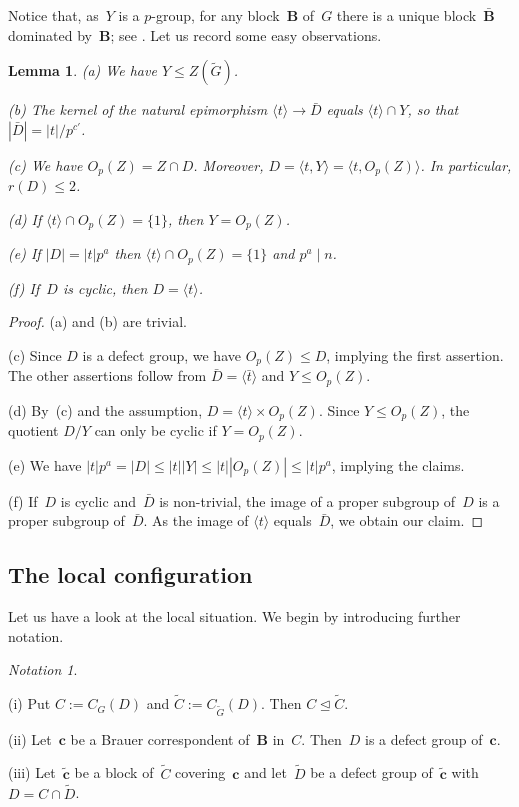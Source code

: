 \documentclass[12pt]{amsart}
\newcommand{\bB}{{\mathbf{B}}}
\newcommand{\bc}{{\mathbf{c}}}
\newtheorem{lem}[thm]{Lemma}
\theoremstyle{theorem}
\theoremstyle{definition}
\theoremstyle{remark}
\newtheorem{notn}[thm]{Notation}
\begin{document}
Notice that, as~$Y$ is a $p$-group, for any block~$\bB$ of~$G$ there is a 
unique block~$\bar{\bB}$ dominated by~$\bB$; see \cite[Theorem~$5.8.11$]{NaTs}.
Let us record some easy observations.

\begin{lem}
\label{YEqualOpZ}
{\rm (a)} We have $Y \leq Z( \tilde{G} )$.

{\rm (b)} The kernel of the natural epimorphism 
$\langle t \rangle \rightarrow \bar{D}$ equals $\langle t \rangle \cap Y$, so
that $|\bar{D}| = |t|/p^{c'}$.

{\rm (c)} We have $O_p( Z ) = Z \cap D$. Moreover, 
$D = \langle t, Y \rangle = \langle t, O_p(Z) \rangle$. In particular, 
$r(D) \leq 2$.

{\rm (d)} If $\langle t \rangle \cap O_p( Z ) = \{ 1 \}$, then $Y = O_p( Z )$.

{\rm (e)} If $|D| = |t|p^{a}$ then 
$\langle t \rangle \cap O_p( Z ) = \{ 1 \}$ and $p^a \mid n$.

{\rm (f)} If~$D$ is cyclic, then $D = \langle t \rangle$.
\end{lem}
\begin{proof}
(a) and (b) are trivial.

(c) Since $D$ is a defect group, we have $O_p( Z ) \leq D$, implying the first 
assertion. The other assertions follow
from $\bar{D} = \langle \bar{t} \rangle$ and $Y \leq O_p(Z)$.

(d) By~(c) and the assumption, $D = \langle t \rangle \times O_p( Z )$. Since 
$Y \leq O_p( Z )$, the quotient $D/Y$ can only be cyclic if $Y = O_p( Z )$.

(e) We have $|t|p^a = |D| \leq |t||Y| \leq |t||O_p(Z)| \leq |t|p^a$, implying
the claims.

(f) If~$D$ is cyclic and~$\bar{D}$ is non-trivial, the image of a proper subgroup 
of~$D$ is a proper subgroup of~$\bar{D}$. As the image of $\langle t \rangle$
equals~$\bar{D}$, we obtain our claim.
\end{proof}

\addtocounter{subsection}{2}
\subsection{The local configuration}
\label{LocalConfiguration}
Let us have a look at the local situation. We begin by introducing further
notation.

\addtocounter{thm}{1}
\begin{notn}
\label{HypoIII}
{\rm
(i) Put $C := C_{G}( D )$ and $\tilde{C} := C_{\tilde{G}}( D )$. 
Then $C \unlhd \tilde{C}$.

(ii) Let~$\bc$ be a Brauer correspondent of~$\bB$ in~$C$. Then~$D$ is a defect 
group of~$\bc$.

(iii) Let~$\tilde{\bc}$ be a block of~$\tilde{C}$ covering~$\bc$ and
let~$\tilde{D}$ be a defect group of~$\tilde{\bc}$ with $D = C \cap \tilde{D}$.
}\hfill{\textsquare}
\end{notn}
\end{document}
